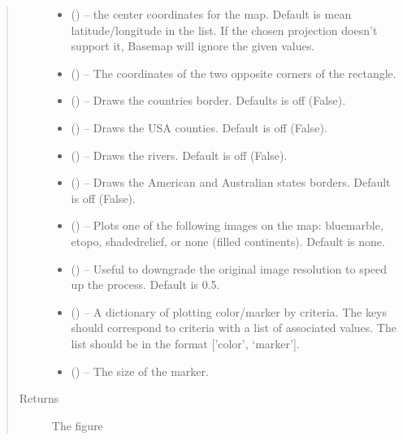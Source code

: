 \documentclass[letterpaper,10pt,english]{sphinxmanual}
\begin{document}
\begin{fulllineitems}
\begin{quote}
\begin{description}
\begin{itemize}
\item {} 
 (\sphinxstyleliteralemphasis{,}\sphinxstyleliteralemphasis{}) -- the center coordinates for the map. Default is
mean latitude/longitude in the list.
If the chosen projection doesn't support it, Basemap will
ignore the given values.

\item {} 
\sphinxstyleliteralstrong{, }\sphinxstyleliteralstrong{, } (\sphinxstyleliteralemphasis{,}\sphinxstyleliteralemphasis{}) -- The coordinates
of the two opposite corners of the rectangle.

\item {} 
 () -- Draws the countries border. Defaults is off (False).

\item {} 
 () -- Draws the USA counties. Default is off (False).

\item {} 
 () -- Draws the rivers. Default is off (False).

\item {} 
 () -- Draws the American and Australian states borders.
Default is off (False).

\item {} 
 () -- Plots one of the following images on the map:
bluemarble, etopo, shadedrelief, or none (filled continents).
Default is none.

\item {} 
 () -- Useful to downgrade the original image resolution to
speed up the process. Default is 0.5.

\item {} 
 () -- A dictionary of plotting color/marker by criteria. The
keys should correspond to  criteria with a list of
associated values. The list should be in the format
{[}'color', `marker'{]}.

\item {} 
 () -- The size of the marker.

\end{itemize}

\item[{Returns}] \leavevmode
The figure

\end{description}\end{quote}

\end{fulllineitems}
\end{document}
